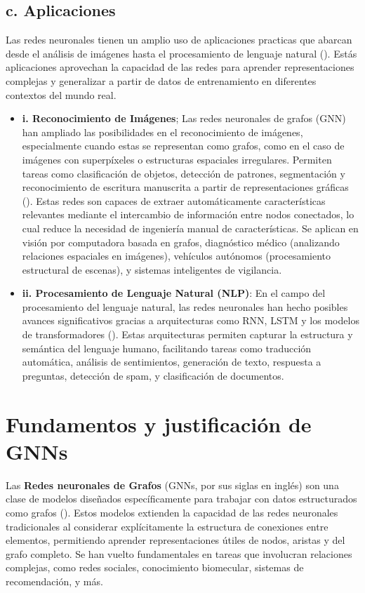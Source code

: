 \documentclass[11pt]{article} %
\begin{document}
\subsection{c. Aplicaciones} 
\vspace{3pt}
Las redes neuronales tienen un amplio uso de aplicaciones practicas que abarcan desde el análisis de imágenes hasta el procesamiento de lenguaje natural (\cite{hui2021gnn}). Estás aplicaciones aprovechan la capacidad de las redes para aprender representaciones complejas y generalizar a partir de datos de entrenamiento en diferentes contextos del mundo real.
\begin{itemize}
\item \textbf{i. Reconocimiento de Imágenes}; \newline
Las redes neuronales de grafos (GNN) han ampliado las posibilidades en el reconocimiento de imágenes, especialmente cuando estas se representan como grafos, como en el caso de imágenes con superpíxeles o estructuras espaciales irregulares. Permiten tareas como clasificación de objetos, detección de patrones, segmentación y reconocimiento de escritura manuscrita a partir de representaciones gráficas (\cite{hui2021gnn}). Estas redes son capaces de extraer automáticamente características relevantes mediante el intercambio de información entre nodos conectados, lo cual reduce la necesidad de ingeniería manual de características. Se aplican en visión por computadora basada en grafos, diagnóstico médico (analizando relaciones espaciales en imágenes), vehículos autónomos (procesamiento estructural de escenas), y sistemas inteligentes de vigilancia.


    \item \textbf{ii. Procesamiento de Lenguaje Natural (NLP)}: \newline
    En el campo del procesamiento del lenguaje natural, las redes neuronales han hecho posibles avances significativos gracias a arquitecturas como RNN, LSTM y los modelos de transformadores (\cite{aws2025nlp}). Estas arquitecturas permiten capturar la estructura y semántica del lenguaje humano, facilitando tareas como traducción automática, análisis de sentimientos, generación de texto, respuesta a preguntas, detección de spam, y clasificación de documentos.
    

\end{itemize}
\newpage
{\section{Fundamentos y justificación de GNNs}} 
\vspace{5pt}
Las \textbf{Redes neuronales de Grafos} (GNNs, por sus siglas en inglés) son una clase de modelos diseñados específicamente para trabajar con datos estructurados como grafos (\cite{hui2021gnn}). Estos modelos extienden la capacidad de las redes neuronales tradicionales al considerar explícitamente la estructura de conexiones entre elementos, permitiendo aprender representaciones útiles de nodos, aristas y del grafo completo. Se han vuelto fundamentales en tareas que involucran relaciones complejas, como redes sociales, conocimiento biomecular, sistemas de recomendación, y más.
\vspace{3pt}
\end{document}
